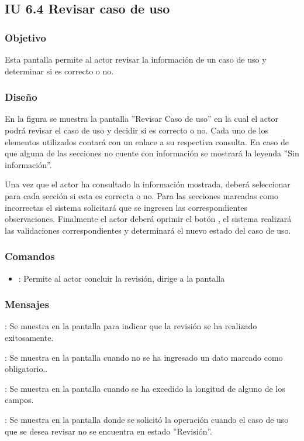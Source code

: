 \subsection{IU 6.4 Revisar caso de uso}

\subsubsection{Objetivo}
	Esta pantalla permite al actor revisar la información de un caso de uso y determinar si es correcto o no.
\subsubsection{Diseño}
	En la figura  se muestra la pantalla ''Revisar Caso de uso'' en la cual el actor podrá revisar el caso de uso y decidir si es correcto o no. Cada uno de los elementos utilizados contará con un enlace a su respectiva consulta. En caso de que alguna de las secciones no cuente con información se mostrará la leyenda ''Sin información''.
	
	Una vez que el actor ha consultado la información mostrada, deberá seleccionar para cada sección si esta es correcta o no. Para las secciones marcadas como incorrectas el sistema solicitará que se ingresen las correspondientes observaciones. Finalmente el actor deberá oprimir el botón  , el sistema realizará las validaciones correspondientes y determinará el nuevo estado del caso de uso.

\subsubsection{Comandos}
\begin{itemize}
	\item {}: Permite al actor concluir la revisión, dirige a la pantalla 
\end{itemize}

\subsubsection{Mensajes}

\begin{Citemize}
	\item {}: Se muestra en la pantalla  para indicar que la revisión se ha realizado exitosamente.
	\item {}: Se muestra en la pantalla  cuando no se ha ingresado un dato marcado como obligatorio..
	\item {}: Se muestra en la pantalla  cuando se ha excedido la longitud de alguno de los campos.
	\item {}: Se muestra en la pantalla donde se solicitó la operación cuando el caso de uso que se desea revisar no se encuentra en estado ''Revisión''.
\end{Citemize}
